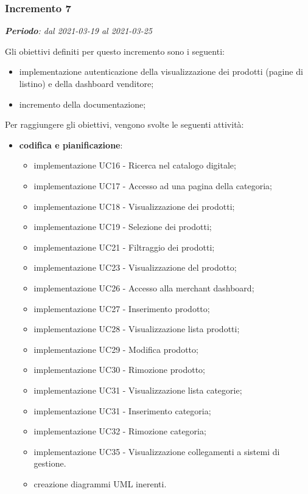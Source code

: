 \subsubsection{Incremento 7}
\textit{\textbf{Periodo}: dal 2021-03-19 al 2021-03-25}

Gli obiettivi definiti per questo incremento sono i seguenti:
\begin{itemize}
\item implementazione autenticazione della visualizzazione dei prodotti (pagine di listino) e della dashboard venditore;
\item incremento della documentazione;
\end{itemize}

Per raggiungere gli obiettivi, vengono svolte le seguenti attività:
\begin{itemize}

\item \textbf{codifica e pianificazione}:
\begin{itemize}
\item implementazione UC16 - Ricerca nel catalogo digitale;
\item implementazione UC17 - Accesso ad una pagina della categoria;
\item implementazione UC18 - Visualizzazione dei prodotti;
\item implementazione UC19 - Selezione dei prodotti;
\item implementazione UC21 - Filtraggio dei prodotti;
\item implementazione UC23 - Visualizzazione del prodotto;
\item implementazione UC26 - Accesso alla merchant dashboard;
\item implementazione UC27 - Inserimento prodotto;
\item implementazione UC28 - Visualizzazione lista prodotti;
\item implementazione UC29 - Modifica prodotto;
\item implementazione UC30 - Rimozione prodotto;
\item implementazione UC31 - Visualizzazione lista categorie;
\item implementazione UC31 - Inserimento categoria;
\item implementazione UC32 - Rimozione categoria;
\item implementazione UC35 - Visualizzazione collegamenti a sistemi di gestione.
\item creazione diagrammi UML inerenti.


\end{itemize}
\end{itemize}
